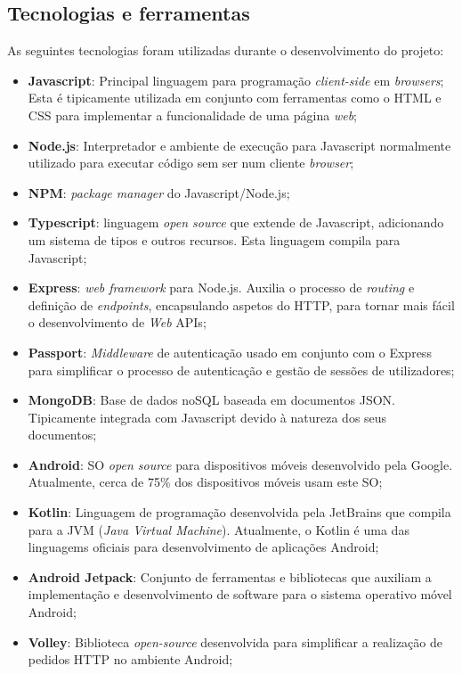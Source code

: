 \subsection{Tecnologias e ferramentas}
As seguintes tecnologias foram utilizadas durante o desenvolvimento do projeto:
\begin{itemize}
	\item \textbf{Javascript}: Principal linguagem para programação \textit{client-side} em \textit{browsers}; Esta é tipicamente utilizada em conjunto com ferramentas como o HTML e CSS para implementar a funcionalidade de uma página \textit{web};
	\item \textbf{Node.js}: Interpretador e ambiente de execução para Javascript normalmente utilizado para executar código sem ser num cliente \textit{browser};
	\item \textbf{NPM}: \textit{package manager} do Javascript/Node.js;
	\item \textbf{Typescript}: linguagem \textit{open source} que extende de Javascript, adicionando um sistema de tipos e outros recursos. Esta linguagem compila para Javascript;
	\item \textbf{Express}: \textit{web framework} para Node.js. Auxilia o processo de \textit{routing} e definição de \textit{endpoints}, encapsulando aspetos do HTTP, para tornar mais fácil o desenvolvimento de \textit{Web} APIs;
	\item \textbf{Passport}: \textit{Middleware} de autenticação usado em conjunto com o Express para simplificar o processo de autenticação e gestão de sessões de utilizadores;
	\item \textbf{MongoDB}: Base de dados noSQL baseada em documentos JSON. Tipicamente integrada com Javascript devido à natureza dos seus documentos;
	\item \textbf{Android}: SO \textit{open source} para dispositivos móveis desenvolvido pela Google. Atualmente, cerca de 75\% dos dispositivos móveis usam este SO;
	\item \textbf{Kotlin}: Linguagem de programação desenvolvida pela JetBrains que compila para a JVM (\textit{Java Virtual Machine}). Atualmente, o Kotlin é uma das linguagems oficiais para desenvolvimento de aplicações Android;
	\item \textbf{Android Jetpack}: Conjunto de ferramentas e bibliotecas que auxiliam a implementação e desenvolvimento de software para o sistema operativo móvel Android;
	\item \textbf{Volley}: Biblioteca \textit{open-source} desenvolvida para simplificar a realização de pedidos HTTP no ambiente Android;

\end{itemize}
